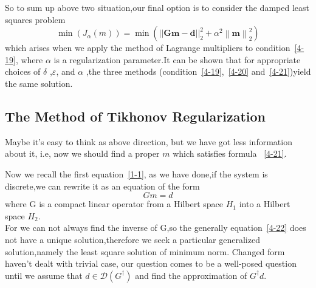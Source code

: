 \documentclass[a4paper]{article}
\newcommand{\tmmathbf}[1]{\ensuremath{\boldsymbol{#1}}}
\begin{document}
So to sum up above two situation,our final option is to consider the damped
least squares problem
\begin{equation}
  \min \left( J_{\alpha} \left( m \right) \right) = \min
  (||\tmmathbf{G}\tmmathbf{m}-\tmmathbf{d}||_2^2 + \alpha^2 \left\|
  \tmmathbf{m} \right\|_2^2)
  \label{4-21}
\end{equation}
which arises when we apply the method of Lagrange multipliers to condition~\ref{4-19}, where $\alpha$ is a regularization parameter.It can be shown that for appropriate
choices of $\delta$ ,$\varepsilon$, and $\alpha$ ,the three methods (condition~\ref{4-19},~\ref{4-20} and~\ref{4-21})yield the same solution.

\subsection{The Method of Tikhonov Regularization}

Maybe it's easy to think as above direction, but we have got less information
about it, i.e, now we should find a proper $m$ which satisfies formula ~\ref{4-21}.

Now we recall the first equation~\ref{1-1}, as we have done,if the system is
discrete,we can rewrite it as an equation of the form
\begin{equation}
  G m = d
  \label{4-22}
\end{equation}
where G is a compact linear operator from a Hilbert space $H_1$ into
a Hilbert space $H_2$.\\

For we can not always find the inverse of G,so the generally equation~\ref{4-22}
does not have a unique solution,therefore we seek a particular generalized
solution,namely the least square solution of minimum norm. Changed form
haven't dealt with trivial case, our question comes to be a well-posed
question until we assume that $d \in \mathcal{D} \left( G^{\dagger} \right)$
and find the approximation of $G^{\dagger} d$. \ \ \ \
\end{document}
